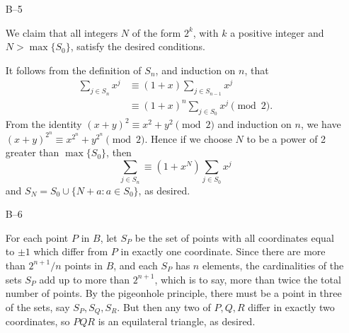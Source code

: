 \documentclass[amssymb,twocolumn,pra,10pt,aps]{revtex4-1}
\begin{document}
\begin{itemize}
\item[B--5]

We claim that all integers $N$ of the form $2^k$, with $k$ a positive
integer and $N>\max\{S_0\}$, satisfy the desired conditions.

It follows from the definition of $S_n$, and induction on $n$, that
\begin{align*}
\sum_{j \in S_n} x^j &\equiv (1+x) \sum_{j \in S_{n-1}} x^j \\
&\equiv (1+x)^n \sum_{j \in S_0} x^j \pmod{2}.
\end{align*}
From the identity $(x+y)^2 \equiv x^2+y^2 \pmod{2}$ and induction
on $n$, we have $(x+y)^{2^n} \equiv x^{2^n} + y^{2^n} \pmod{2}$.
Hence if we choose $N$ to be a power of 2 greater than $\max\{S_0\}$, then
\[
\sum_{j \in S_n} \equiv (1+x^N) \sum_{j \in S_0} x^j
\]
and $S_N=S_0\cup\{N+a: a\in S_0\}$, as desired.


\item[B--6]

For each point $P$ in $B$, let $S_P$ be the set of points with
all coordinates equal to $\pm 1$ which
differ from $P$ in exactly one coordinate. Since there are more than
$2^{n+1}/n$ points in $B$, and each $S_P$ has $n$ elements, the
cardinalities of the sets $S_P$ add up to more than $2^{n+1}$, which
is to say, more than twice the total number of points. By the
pigeonhole principle, there must be a point in three of the
sets, say $S_P, S_Q, S_R$. But then any two of $P, Q, R$ differ in
exactly two coordinates, so $PQR$ is an equilateral triangle, as
desired.


\end{itemize}
\end{document}
